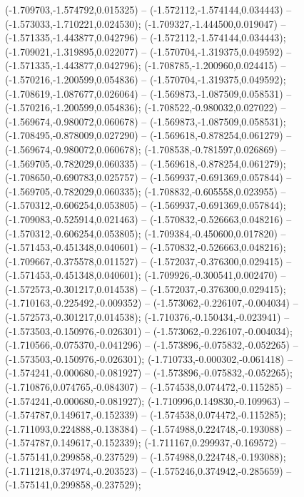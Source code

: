  (-1.709703,-1.574792,0.015325) -- (-1.572112,-1.574144,0.034443) -- (-1.573033,-1.710221,0.024530);
 (-1.709327,-1.444500,0.019047) -- (-1.571335,-1.443877,0.042796) -- (-1.572112,-1.574144,0.034443);
 (-1.709021,-1.319895,0.022077) -- (-1.570704,-1.319375,0.049592) -- (-1.571335,-1.443877,0.042796);
 (-1.708785,-1.200960,0.024415) -- (-1.570216,-1.200599,0.054836) -- (-1.570704,-1.319375,0.049592);
 (-1.708619,-1.087677,0.026064) -- (-1.569873,-1.087509,0.058531) -- (-1.570216,-1.200599,0.054836);
 (-1.708522,-0.980032,0.027022) -- (-1.569674,-0.980072,0.060678) -- (-1.569873,-1.087509,0.058531);
 (-1.708495,-0.878009,0.027290) -- (-1.569618,-0.878254,0.061279) -- (-1.569674,-0.980072,0.060678);
 (-1.708538,-0.781597,0.026869) -- (-1.569705,-0.782029,0.060335) -- (-1.569618,-0.878254,0.061279);
 (-1.708650,-0.690783,0.025757) -- (-1.569937,-0.691369,0.057844) -- (-1.569705,-0.782029,0.060335);
 (-1.708832,-0.605558,0.023955) -- (-1.570312,-0.606254,0.053805) -- (-1.569937,-0.691369,0.057844);
 (-1.709083,-0.525914,0.021463) -- (-1.570832,-0.526663,0.048216) -- (-1.570312,-0.606254,0.053805);
 (-1.709384,-0.450600,0.017820) -- (-1.571453,-0.451348,0.040601) -- (-1.570832,-0.526663,0.048216);
 (-1.709667,-0.375578,0.011527) -- (-1.572037,-0.376300,0.029415) -- (-1.571453,-0.451348,0.040601);
 (-1.709926,-0.300541,0.002470) -- (-1.572573,-0.301217,0.014538) -- (-1.572037,-0.376300,0.029415);
 (-1.710163,-0.225492,-0.009352) -- (-1.573062,-0.226107,-0.004034) -- (-1.572573,-0.301217,0.014538);
 (-1.710376,-0.150434,-0.023941) -- (-1.573503,-0.150976,-0.026301) -- (-1.573062,-0.226107,-0.004034);
 (-1.710566,-0.075370,-0.041296) -- (-1.573896,-0.075832,-0.052265) -- (-1.573503,-0.150976,-0.026301);
 (-1.710733,-0.000302,-0.061418) -- (-1.574241,-0.000680,-0.081927) -- (-1.573896,-0.075832,-0.052265);
 (-1.710876,0.074765,-0.084307) -- (-1.574538,0.074472,-0.115285) -- (-1.574241,-0.000680,-0.081927);
 (-1.710996,0.149830,-0.109963) -- (-1.574787,0.149617,-0.152339) -- (-1.574538,0.074472,-0.115285);
 (-1.711093,0.224888,-0.138384) -- (-1.574988,0.224748,-0.193088) -- (-1.574787,0.149617,-0.152339);
 (-1.711167,0.299937,-0.169572) -- (-1.575141,0.299858,-0.237529) -- (-1.574988,0.224748,-0.193088);
 (-1.711218,0.374974,-0.203523) -- (-1.575246,0.374942,-0.285659) -- (-1.575141,0.299858,-0.237529);
